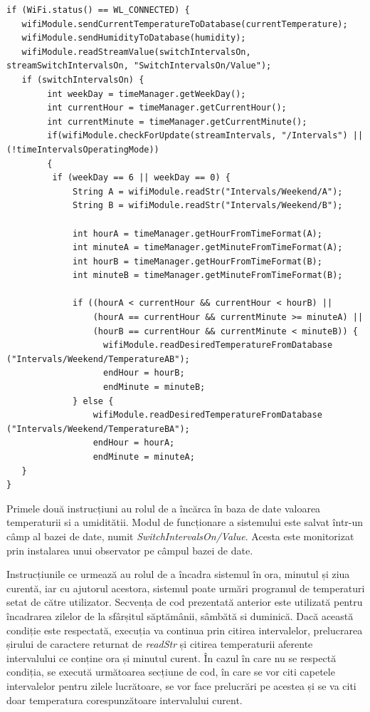 \begin{lstlisting}
if (WiFi.status() == WL_CONNECTED) {
   wifiModule.sendCurrentTemperatureToDatabase(currentTemperature);
   wifiModule.sendHumidityToDatabase(humidity);
   wifiModule.readStreamValue(switchIntervalsOn, streamSwitchIntervalsOn, "SwitchIntervalsOn/Value");
   if (switchIntervalsOn) {
        int weekDay = timeManager.getWeekDay();
        int currentHour = timeManager.getCurrentHour();
        int currentMinute = timeManager.getCurrentMinute();
        if(wifiModule.checkForUpdate(streamIntervals, "/Intervals") || (!timeIntervalsOperatingMode))
        {
         if (weekDay == 6 || weekDay == 0) {
             String A = wifiModule.readStr("Intervals/Weekend/A");
             String B = wifiModule.readStr("Intervals/Weekend/B");

             int hourA = timeManager.getHourFromTimeFormat(A);
             int minuteA = timeManager.getMinuteFromTimeFormat(A);
             int hourB = timeManager.getHourFromTimeFormat(B);
             int minuteB = timeManager.getMinuteFromTimeFormat(B);

             if ((hourA < currentHour && currentHour < hourB) ||
                 (hourA == currentHour && currentMinute >= minuteA) ||
                 (hourB == currentHour && currentMinute < minuteB)) {
                   wifiModule.readDesiredTemperatureFromDatabase ("Intervals/Weekend/TemperatureAB");
                   endHour = hourB;
                   endMinute = minuteB;
             } else {
                 wifiModule.readDesiredTemperatureFromDatabase ("Intervals/Weekend/TemperatureBA");
                 endHour = hourA;
                 endMinute = minuteA;       
   }
} 
\end{lstlisting}

\vspace{2em}	

	Primele două instrucțiuni au rolul de a încărca în baza de date valoarea temperaturii si a umiditătii. Modul de funcționare a sistemului este salvat într-un câmp al bazei de date, numit \textit{SwitchIntervalsOn/Value}. Acesta este monitorizat prin instalarea unui observator pe câmpul bazei de date. 

	Instrucțiunile ce urmează au rolul de a încadra sistemul în ora, minutul și ziua curentă, iar cu ajutorul acestora, sistemul poate urmări programul de temperaturi setat de către utilizator. Secvența de cod prezentată anterior este utilizată pentru încadrarea zilelor de la sfârșitul săptămânii, sâmbătă si duminică. Dacă această condiție este respectată, execuția va continua prin citirea intervalelor, prelucrarea șirului de caractere returnat de \textit{readStr} și citirea temperaturii aferente intervalului ce conține ora și minutul curent. În cazul în care nu se respectă condiția, se execută următoarea secțiune de cod, în care se vor citi capetele intervalelor pentru zilele lucrătoare, se vor face prelucrări pe acestea și se va citi doar temperatura corespunzătoare intervalului curent.   


